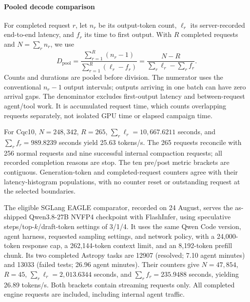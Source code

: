\paragraph{Pooled decode comparison}
For completed request $r$, let $n_r$ be its output-token count, $\ell_r$ its server-recorded end-to-end latency, and $f_r$ its time to first output. With $R$ completed requests and $N=\sum_r n_r$, we use
\begin{equation}
 D_{\mathrm{pool}} =
 \frac{\sum_{r=1}^{R}(n_r-1)}{\sum_{r=1}^{R}(\ell_r-f_r)}
 = \frac{N-R}{\sum_r\ell_r-\sum_r f_r}.
 \label{eq:pooled-decode}
\end{equation}
Counts and durations are pooled before division. The numerator uses the conventional $n_r-1$ output intervals; outputs arriving in one batch can have zero arrival gaps. The denominator excludes first-output latency and between-request agent/tool work. It is accumulated request time, which counts overlapping requests separately, not isolated GPU time or elapsed campaign time.

For Cqc10, $N=248{,}342$, $R=265$, $\sum_r\ell_r=10{,}667.6211$ seconds, and $\sum_r f_r=989.8239$ seconds yield 25.63 tokens/s. The 265 requests reconcile with 256 normal requests and nine successful internal compaction requests; all recorded completion reasons are stop. The ten pre/post metric brackets are contiguous. Generation-token and completed-request counters agree with their latency-histogram populations, with no counter reset or outstanding request at the selected boundaries.

The eligible SGLang EAGLE comparator, recorded on 24 August, serves the as-shipped Qwen3.8-27B NVFP4 checkpoint with FlashInfer, using speculative steps/top-$k$/draft-token settings of 3/1/4. It uses the same Qwen Code version, agent harness, requested sampling settings, and network policy, with a 24,000-token response cap, a 262,144-token context limit, and an 8,192-token prefill chunk. Its two completed Astropy tasks are 12907 (resolved; 7.10 agent minutes) and 13033 (failed tests; 26.96 agent minutes). Their counters give $N=47{,}854$, $R=45$, $\sum_r\ell_r=2{,}013.6344$ seconds, and $\sum_r f_r=235.9488$ seconds, yielding 26.89 tokens/s. Both brackets contain streaming requests only. All completed engine requests are included, including internal agent traffic.

